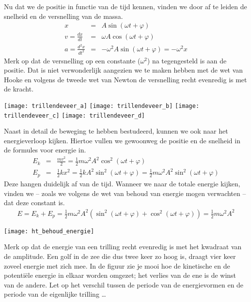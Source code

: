 \documentclass{ximera}
\begin{document}
	Nu dat we de positie in functie van de tijd kennen, vinden we door af te leiden de snelheid en de versnelling van de massa. 
	\begin{eqnarray*}
	x&=&A\sin(\omega t+\varphi)\\[3mm]
	v=\frac{dx}{dt}&=&\omega A\cos(\omega t+\varphi)\\[3mm]
	a=\frac{d^2x}{dt^2}&=&-\omega^2A\sin(\omega t+\varphi)=-\omega^2x
	\end{eqnarray*}
	Merk op dat de versnelling op een constante ($\omega^2$) na tegengesteld is aan de positie. Dat is niet verwonderlijk aangezien we te maken hebben met de wet van Hooke en volgens de tweede wet van Newton de versnelling recht evenredig is met de kracht. 
	
	
	\begin{image}
		
		\texttt{[image: trillendeveer\_a]}
		\texttt{[image: trillendeveer\_b]}
		\texttt{[image: trillendeveer\_c]}
		\texttt{[image: trillendeveer\_d]}
		
	\end{image}
	
	\clearpage
	
	Naast in detail de beweging te hebben bestudeerd, kunnen we ook naar het energieverloop kijken. Hiertoe vullen we gewoonweg de positie en de snelheid in de formules voor energie in.
	\begin{eqnarray*}
	E_k&=&\frac{mv^2}{2}=\frac{1}{2}m\omega^2A^2\cos^2(\omega t+\varphi)\\
	E_p&=&\frac{1}{2}kx^2=\frac{1}{2}kA^2\sin^2(\omega t+\varphi)=\frac{1}{2}m\omega^2A^2\sin^2(\omega t+\varphi)
	\end{eqnarray*}
	Deze hangen duidelijk af van de tijd. Wanneer we naar de totale energie kijken, vinden we -- zoals we volgens de wet van behoud van energie mogen verwachten -- dat deze constant is.
	\begin{eqnarray*}
	E=E_k+E_p=\frac{1}{2}m\omega^2A^2\left(\sin^2(\omega t+\varphi)+\cos^2(\omega t+\varphi)\right)=\frac{1}{2}m\omega^2A^2
	\end{eqnarray*}
	\begin{image}
	
	\texttt{[image: ht\_behoud\_energie]}
	\end{image}
	Merk op dat de energie van een trilling recht evenredig is met het kwadraat van de amplitude. Een golf in de zee die dus twee keer zo hoog is, draagt vier keer zoveel energie met zich mee. In de figuur zie je mooi hoe de kinetische en de potentiële energie in elkaar worden omgezet; het verlies van de ene is de winst van de andere. Let op het verschil tussen de periode van de energievormen en de periode van de eigenlijke trilling \ldots
	
	
\end{document}
